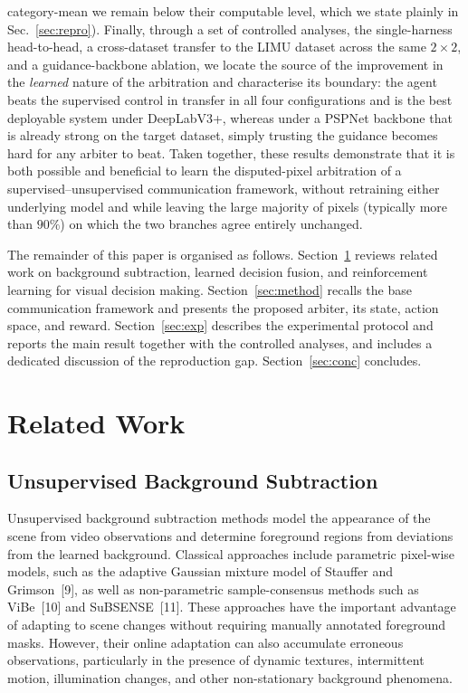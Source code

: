\documentclass[sn-basic]{sn-jnl}
\begin{document}
category-mean we remain below their computable level, which we state plainly in
Sec.~\ref{sec:repro}). Finally,
through a set of controlled analyses, the single-harness head-to-head, a
cross-dataset transfer to the LIMU dataset across the same $2\times2$, and a
guidance-backbone ablation, we locate the source of the improvement in the
\emph{learned} nature of the arbitration and characterise its boundary: the agent
beats the supervised control in transfer in all four configurations and is the best
deployable system under DeepLabV3+, whereas under a PSPNet backbone that is already
strong on the target dataset, simply trusting the guidance becomes hard for any
arbiter to beat. Taken
together, these results demonstrate that it is both possible and beneficial to learn
the disputed-pixel arbitration of a supervised--unsupervised communication
framework, without retraining either underlying model and while leaving the
large majority of pixels (typically more than $90\%$) on which the two branches agree entirely unchanged.

The remainder of this paper is organised as follows. Section~\ref{sec:related}
reviews related work on background subtraction, learned decision fusion, and
reinforcement learning for visual decision making. Section~\ref{sec:method} recalls
the base communication framework and presents the proposed arbiter, its state,
action space, and reward. Section~\ref{sec:exp} describes the experimental protocol
and reports the main result together with the controlled analyses, and includes a
dedicated discussion of the reproduction gap. Section~\ref{sec:conc} concludes.

% 
% 
\section{Related Work}
\label{sec:related}

\subsection{Unsupervised Background Subtraction}
Unsupervised background subtraction methods model the appearance of the scene from
video observations and determine foreground regions from deviations from the
learned background. Classical approaches include parametric pixel-wise models, such
as the adaptive Gaussian mixture model of Stauffer and Grimson~[9], as well as
non-parametric sample-consensus methods such as ViBe~[10] and SuBSENSE~[11]. These
approaches have the important advantage of adapting to scene changes without
requiring manually annotated foreground masks. However, their online adaptation can
also accumulate erroneous observations, particularly in the presence of dynamic
textures, intermittent motion, illumination changes, and other non-stationary
background phenomena.
\end{document}
